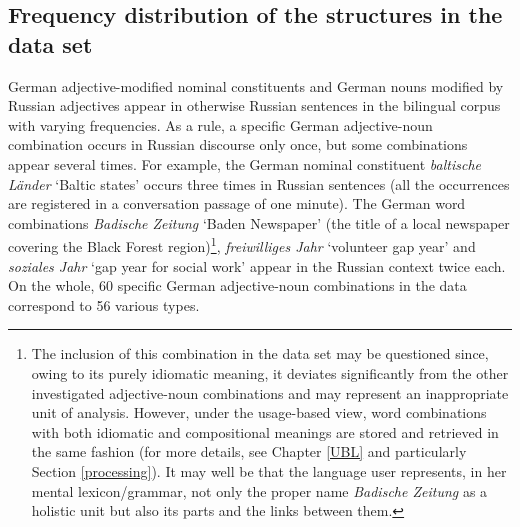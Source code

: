 \subsection{Frequency distribution of the structures in the data set}\label{sec:frequency-distribution}
German adjective-modified nominal constituents and German nouns modified by Russian adjectives appear in otherwise Russian sentences in the bilingual corpus with varying frequencies. As a rule, a specific German adjective-noun combination occurs in Russian discourse only once, but some combinations appear several times. For example, the German nominal constituent \textit{baltische Länder} `Baltic states' occurs three times in Russian sentences (all the occurrences are registered in a conversation passage of one minute). The German word combinations \textit{Badische Zeitung} `Baden Newspaper' (the title of a local newspaper covering the Black Forest region)\footnote{The inclusion of this  combination in the data set may be questioned since, owing to its purely idiomatic meaning, it deviates significantly from the other investigated adjective-noun combinations and may represent an inappropriate unit of analysis. However, under the usage-based view, word combinations with both idiomatic and compositional meanings are stored and retrieved in the same fashion (for more details, see Chapter \ref{UBL} and particularly Section \ref{processing}). It may well be that the language user represents, in her mental lexicon/grammar, not only the proper name \textit{Badische Zeitung} as a holistic unit but also its parts and the links between them.}, \textit{freiwilliges Jahr} `volunteer gap year' and \textit{soziales Jahr} `gap year for social work' appear in the Russian context twice each. On the whole, 60 specific German adjective-noun combinations in the data correspond to 56 various types. 

